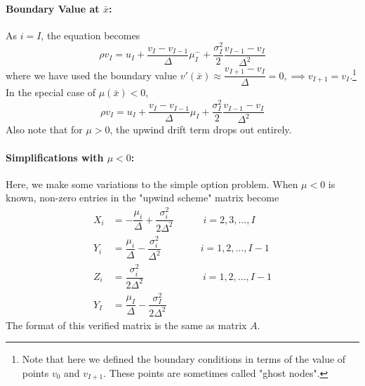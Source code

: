 \documentclass[11pt]{etk-article}
\begin{document}
\paragraph{Boundary Value at $\bar{x}$:}
As $i=I$, the equation becomes
\begin{equation}
\rho v_I = u_I + \dfrac{v_I-v_{I-1}}{\Delta}\mu_I^{-}  + \dfrac{\sigma_I^2}{2} \dfrac{ v_{I-1}-v_I}{\Delta^2}
\end{equation}
where we have used the boundary value $v'(\bar{x}) \approx \dfrac{v_{I+1}-v_I}{\Delta} = 0, \implies v_{I+1} = v_I$.\footnote{Note that here we defined the boundary conditions in terms of the value of points $v_0$ and $v_{I+1}$. These points are sometimes called "ghost nodes".}
In the special case of $\mu(\bar{x}) < 0$,
\begin{equation}
\rho v_I = u_I + \dfrac{v_I-v_{I-1}}{\Delta} \mu_I + \dfrac{\sigma_I^2}{2} \dfrac{ v_{I-1}-v_I}{\Delta^2}
\end{equation}
Also note that for $\mu > 0$, the upwind drift term drops out entirely.


\paragraph{Simplifications with $\mu < 0$:}
Here, we make some variations to the simple option problem. When $\mu < 0$ is known, non-zero entries in the "upwind scheme" matrix become
\begin{align}
X_i &= -\dfrac{\mu_i}{\Delta} + \dfrac{\sigma_i^2}{2\Delta^2} \qquad \quad  i = 2, 3, ..., I \\
Y_i &= \dfrac{\mu_i}{\Delta} - \dfrac{\sigma_i^2}{\Delta^2} \qquad \qquad   i = 1, 2, ..., I-1 \\
Z_i &= \dfrac{\sigma_i^2}{2\Delta^2} \qquad  \qquad \qquad i = 1, 2, ..., I-1\\
Y_I & = \dfrac{\mu_I}{\Delta} - \dfrac{\sigma_I^2}{2\Delta^2}
\end{align}
The format of this verified matrix is the same as matrix $A$.





\end{document}
